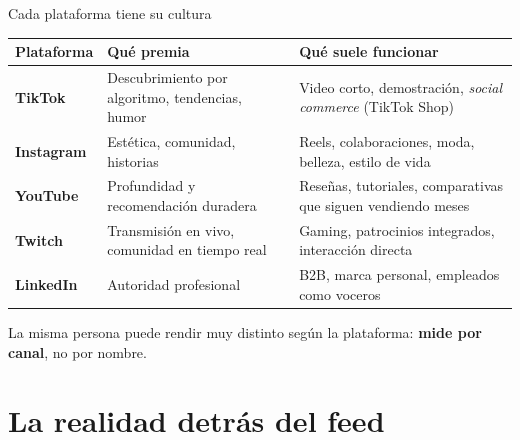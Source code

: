 \documentclass[aspectratio=169,xcolor=dvipsnames]{beamer}
\begin{document}
\begin{frame}{Cada plataforma tiene su cultura}
\footnotesize
\renewcommand{\arraystretch}{1.15}
\begin{tabular}{@{}p{2.2cm}p{5.2cm}p{6.2cm}@{}}
\toprule
\rowcolor{IPNguindaClara}\textbf{Plataforma} & \textbf{Qué premia} & \textbf{Qué suele funcionar}\\
\midrule
\textbf{TikTok} & Descubrimiento por algoritmo, tendencias, humor & Video corto, demostración, \emph{social commerce} (TikTok Shop)\\
\textbf{Instagram} & Estética, comunidad, historias & Reels, colaboraciones, moda, belleza, estilo de vida\\
\textbf{YouTube} & Profundidad y recomendación duradera & Reseñas, tutoriales, comparativas que siguen vendiendo meses\\
\textbf{Twitch} & Transmisión en vivo, comunidad en tiempo real & Gaming, patrocinios integrados, interacción directa\\
\textbf{LinkedIn} & Autoridad profesional & B2B, marca personal, empleados como voceros\\
\bottomrule
\end{tabular}
\vspace{4pt}
\begin{center}\scriptsize La misma persona puede rendir muy distinto según la plataforma: \textbf{mide por canal}, no por nombre.\end{center}
\end{frame}

\section[La realidad]{La realidad detrás del feed}
\end{document}
